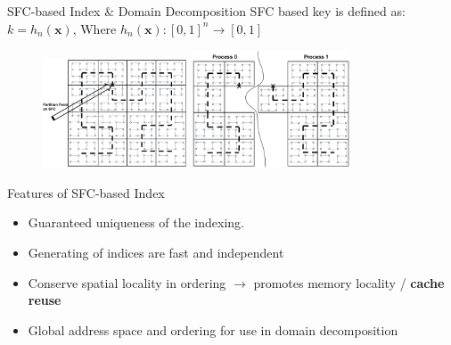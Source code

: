 \documentclass{beamer}
\begin{document}
\begin{frame}{SFC-based Index $\&$ Domain Decomposition}
SFC based key is defined as: $k = h_n (\textbf{x})$, Where $h_n (\textbf{x}): [0,1]^n \rightarrow [0,1]$
\begin{figure}
\flushleft
\includegraphics[width=0.385\textwidth]{../SFC_particles_buckets}
\hfill
\includegraphics[width=0.415\textwidth]{../SFC_particles_buckets_partition}
\end{figure}
\begin{block}{Features of SFC-based Index}
  \begin{itemize}
  \item {
    Guaranteed uniqueness of the indexing.
  }
  \item {
    Generating of indices are fast and
independent
  }
  \item {
    Conserve spatial locality in ordering $\rightarrow$ promotes memory locality / {\bf cache reuse}
  }
  \item {
    Global address space and ordering for use in  domain decomposition
  }
  \end{itemize}
\end{block}
\end{frame}
\end{document}
